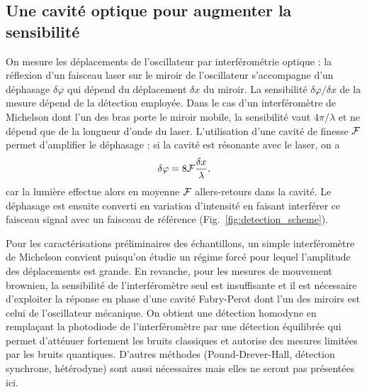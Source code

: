 \documentclass[12pt,a4paper]{article}
\begin{document}
\subsection{Une cavité optique pour augmenter la sensibilité}
\label{sec:cavity}

On mesure les déplacements de l'oscillateur par interférométrie optique : la réflexion d'un faisceau laser sur le miroir de l'oscillateur s'accompagne d'un déphasage $\delta\varphi$ qui dépend du déplacement $\delta x$ du miroir.
La sensibilité $\delta\varphi / \delta x$ de la mesure dépend de la détection employée.
Dans le cas d'un interféromètre de Michelson dont l'un des bras porte le miroir mobile, la sensibilité vaut $4\pi/\lambda$ et ne dépend que de la longueur d'onde du laser.
L'utilisation d'une cavité de finesse $\cal{F}$ permet d'amplifier le déphasage : si la cavité est résonante avec le laser, on a
\begin{equation}
\delta \varphi = 8{\cal{F}}\frac{\delta x}{\lambda},
\end{equation}
car la lumière effectue alors en moyenne ${\cal{F}}$ allers-retours dans la cavité.
Le déphasage est ensuite converti en variation d'intensité en faisant interférer ce faisceau signal avec un faisceau de référence (Fig.~\ref{fig:detection_scheme}).

Pour les caractérisations préliminaires des échantillons, un simple interféromètre de Michelson convient puisqu'on étudie un régime forcé pour lequel l'amplitude des déplacements est grande.
En revanche, pour les mesures de mouvement brownien, la sensibilité de l'interféromètre seul est insuffisante et il est nécessaire d'exploiter la réponse en phase d'une cavité Fabry-Perot dont l'un des miroirs est celui de l'oscillateur mécanique.
On obtient une détection homodyne en remplaçant la photodiode de l'interféromètre par une détection équilibrée qui permet d'atténuer fortement les bruits classiques et autorise des mesures limitées par les bruits quantiques. 
D'autres méthodes (Pound-Drever-Hall, détection synchrone, hétérodyne) sont aussi nécessaires mais elles ne seront pas présentées ici.
\end{document}
